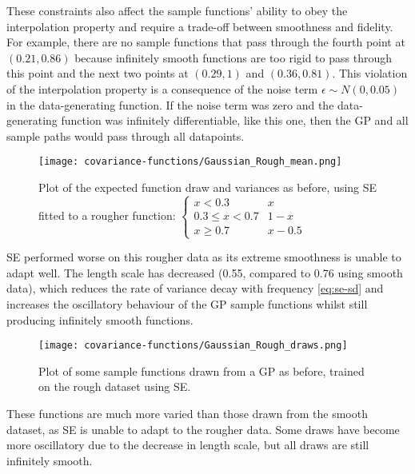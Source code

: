 These constraints also affect the sample functions' ability to obey the interpolation property and require a trade-off between smoothness and fidelity. For example, there are no sample functions that pass through the fourth point at $(0.21, 0.86)$ because infinitely smooth functions are too rigid to pass through this point and the next two points at $(0.29, 1)$ and $(0.36, 0.81)$. This violation of the interpolation property is a consequence of the noise term $\epsilon \sim N(0, 0.05)$ in the data-generating function. If the noise term was zero and the data-generating function was infinitely differentiable, like this one, then the GP and all sample paths would pass through all datapoints.

\begin{figure}[H]
    \texttt{[image: covariance-functions/Gaussian\_Rough\_mean.png]}
    \caption{Plot of the expected function draw and variances as before, using SE fitted to a rougher function:
        $\begin{cases}
                x < 0.3 & x \\
                0.3 \leq x < 0.7 & 1 - x \\
                x \geq 0.7 & x - 0.5
        \end{cases}$
    }
\end{figure}
SE performed worse on this rougher data as its extreme smoothness is unable to adapt well. The length scale has decreased (0.55, compared to 0.76 using smooth data), which reduces the rate of variance decay with frequency \ref{eq:se-sd} and increases the oscillatory behaviour of the GP sample functions whilst still producing infinitely smooth functions.

\begin{figure}[H]
    \texttt{[image: covariance-functions/Gaussian\_Rough\_draws.png]}
    \caption{Plot of some sample functions drawn from a GP as before, trained on the rough dataset using SE.
    }
\end{figure}
These functions are much more varied than those drawn from the smooth dataset, as SE is unable to adapt to the rougher data. Some draws have become more oscillatory due to the decrease in length scale, but all draws are still infinitely smooth.

